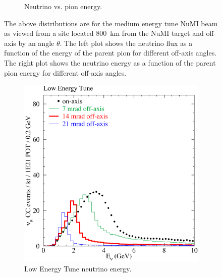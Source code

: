 \begin{figure}
\begin{subfigure}[b]{0.45\textwidth}
  \caption{Neutrino vs. pion energy.}
  \label{fig:NuPiFluxb}
  \end{subfigure}
  \caption{The above distributions are for the medium energy tune NuMI
    beam as viewed from a site located
    800~km from the NuMI target and off-axis by an angle $\theta$. The
    left plot shows the neutrino flux as a function of the energy of
    the parent pion for different off-axis angles. The right plot
    shows the neutrino energy as a function of the parent pion energy
    for different off-axis angles.~\cite{TDR}}
  \label{fig:NuPiFlux}
\end{figure}



\begin{figure}
  \centering
  \begin{subfigure}[b]{0.45\textwidth}
    \includegraphics[width=\textwidth]{../../img/baird/beam/040-le-spectra.png}
    \caption{Low Energy Tune neutrino energy.  }
    \label{fig:NuESpectra_MEAndLE_a}
  \end{subfigure}
  \hfill
  \begin{subfigure}[b]{0.45\textwidth}

\end{subfigure}
\end{figure}
